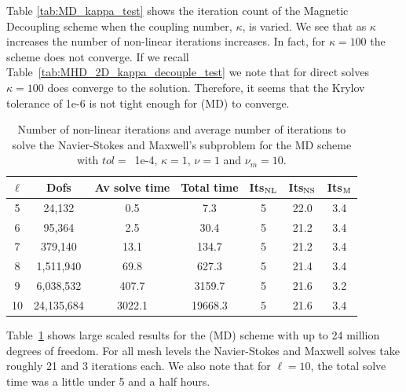Table \ref{tab:MD_kappa_test} shows the iteration count of the Magnetic Decoupling scheme when the coupling number, $\kappa$, is varied. We see that as $\kappa$ increases the number of non-linear iterations increases. In fact, for $\kappa = 100$ the scheme does not converge. If we recall Table~\ref{tab:MHD_2D_kappa_decouple_test} we note that for direct solves $\kappa = 100$ does converge to the solution. Therefore, it seems that the Krylov tolerance of 1e-6 is not tight enough for (MD) to converge.



\begin{table}[h!] \small
\begin{center}
\begin{tabular}{ccccccc}
\hline
$\ell$ &      Dofs &  Av solve time &  Total time &  Its$_{\rm NL}$ &     Its$_{\rm NS}$ &    Its$_{\rm M}$ \\
\hline
 5 &    24,132 &       0.5 &           7.3 &                  5 &        22.0 &        3.4 \\
 6 &    95,364 &       2.5 &          30.4 &                  5 &        21.2 &        3.4 \\
 7 &   379,140 &      13.1 &         134.7 &                  5 &        21.2 &        3.4 \\
 8 &  1,511,940 &      69.8 &         627.3 &                  5 &        21.4 &        3.4 \\
 9 &  6,038,532 &     407.7 &        3159.7 &                  5 &        21.6 &        3.2 \\
  10 &  24,135,684 &    3022.1 &       19668.3 &                  5 &        21.6 &        3.4 \\
\hline
\end{tabular}
\caption{Number of non-linear iterations and average number of iterations to solve the Navier-Stokes and Maxwell's subproblem for the MD scheme with $tol=$~1e-4, $\kappa = 1$, $\nu = 1$ and $\nu_m = 10$.}
\label{tab:MD_large_scale}
\end{center}
\end{table}
Table~\ref{tab:MD_large_scale} shows large scaled results for the (MD) scheme with up to 24 million degrees of freedom. For all mesh levels the Navier-Stokes and Maxwell solves take roughly 21 and 3 iterations each. We also note that for $\ell=10$, the total solve time was a little under 5 and a half hours.


